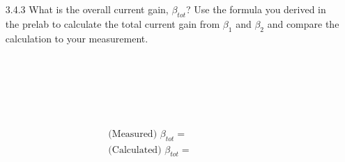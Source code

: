 \documentclass{article}
\begin{document}
\begin{enumerate}
  
\item[3.4.3] What is the overall current gain, $\beta_{tot}$? Use the formula you derived in the prelab to calculate the total current gain from $\beta_1$ and $\beta_2$ and compare the calculation to your measurement.
  \\~\\~\\~\\~\\~\\~\\
  \begin{align*}
    \text{(Measured) } \boxed{\beta_{tot} = ~~~~~~~~~~~~~~~~~~~~~ } \\
    \text{(Calculated) } \boxed{\beta_{tot} = ~~~~~~~~~~~~~~~~~~~~~ } \\
  \end{align*}
  
\end{enumerate}
\end{document}

